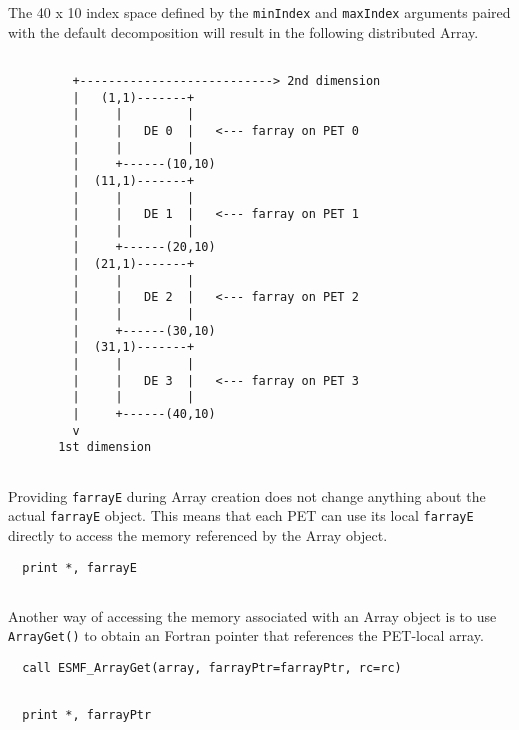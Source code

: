    The 40 x 10 index space defined by the {\tt minIndex} and {\tt maxIndex} 
   arguments paired with the default decomposition will result in the following
   distributed Array.
  
   \begin{verbatim}
  
         +---------------------------> 2nd dimension
         |   (1,1)-------+
         |     |         |
         |     |   DE 0  |   <--- farray on PET 0
         |     |         |
         |     +------(10,10)
         |  (11,1)-------+
         |     |         |
         |     |   DE 1  |   <--- farray on PET 1
         |     |         |
         |     +------(20,10)
         |  (21,1)-------+
         |     |         |
         |     |   DE 2  |   <--- farray on PET 2
         |     |         |
         |     +------(30,10)
         |  (31,1)-------+
         |     |         |
         |     |   DE 3  |   <--- farray on PET 3
         |     |         |
         |     +------(40,10)
         v
       1st dimension
  
   \end{verbatim}
  
   Providing {\tt farrayE} during Array creation does not change anything about
   the actual {\tt farrayE} object. This means that each PET can use its
   local {\tt farrayE} directly to access the memory referenced by the Array 
   object. 

 \begin{verbatim}
  print *, farrayE
 
\end{verbatim}
 

  
   Another way of accessing the memory associated with an Array object is to 
   use {\tt ArrayGet()} to obtain an Fortran pointer that references the
   PET-local array. 

 \begin{verbatim}
  call ESMF_ArrayGet(array, farrayPtr=farrayPtr, rc=rc)
 
\end{verbatim}
 

 \begin{verbatim}
  print *, farrayPtr
 
\end{verbatim}
 
